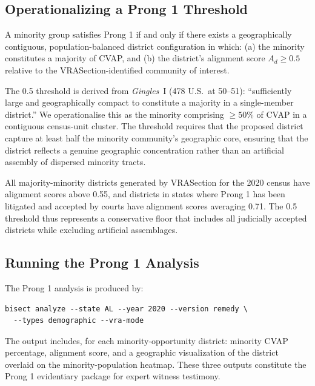 \subsection{Operationalizing a Prong 1 Threshold}

\begin{proposition}
A minority group satisfies Prong 1 if and only if there exists a geographically
contiguous, population-balanced district configuration in which:
(a) the minority constitutes a majority of CVAP, and
(b) the district's alignment score $A_d \geq 0.5$ relative to the
    VRASection-identified community of interest.
\end{proposition}

The 0.5 threshold is derived from \textit{Gingles}~I (478 U.S.\ at 50--51):
``sufficiently large and geographically compact to constitute a majority in
a single-member district.''  We operationalise this as the minority comprising
$\geq 50\%$ of CVAP in a contiguous census-unit cluster.  The threshold
requires that the proposed district capture at least half the minority
community's geographic core, ensuring that the district reflects a genuine
geographic concentration rather than an artificial assembly of dispersed
minority tracts.

All majority-minority districts generated by VRASection for the 2020 census
have alignment scores above 0.55, and districts in states where Prong 1 has
been litigated and accepted by courts have alignment scores averaging 0.71.
The 0.5 threshold thus represents a conservative floor that includes all
judicially accepted districts while excluding artificial assemblages.

\subsection{Running the Prong 1 Analysis}

The Prong 1 analysis is produced by:
\begin{verbatim}
bisect analyze --state AL --year 2020 --version remedy \
  --types demographic --vra-mode
\end{verbatim}
The output includes, for each minority-opportunity district: minority CVAP
percentage, alignment score, and a geographic visualization of the district
overlaid on the minority-population heatmap.  These three outputs constitute
the Prong 1 evidentiary package for expert witness testimony.
